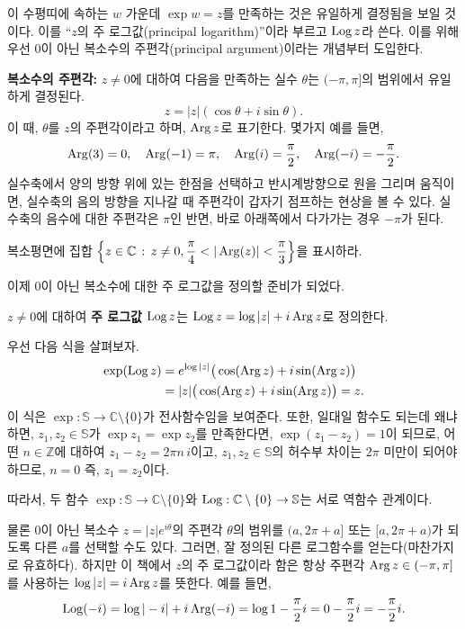 이 수평띠에 속하는 $w$ 가운데 $\exp w = z$를 만족하는 것은
유일하게 결정됨을 보일 것이다. 
이를 ``$z$의 주 로그값(principal logarithm)''이라 부르고 $\mathop{\mathrm{Log}} z$라 쓴다.
이를 위해 우선 $0$이 아닌 복소수의 주편각(principal argument)이라는 개념부터 도입한다.

{\bf 복소수의 주편각: }
$z\ne0$에 대하여 다음을 만족하는 실수 $\theta$는 $(-\pi, \pi]$의 범위에서 유일하게 결정된다.
$$
z = |z|(\cos \theta + i\sin\theta).
$$
이 때, $\theta$를 $z$의 주편각이라고 하며, $\mathop{\mathrm{Arg}} z$로 표기한다.
몇가지 예를 들면,
$$
\mathop{\mathrm{Arg}}(3) = 0, \quad \mathop{\mathrm{Arg}}(-1)=\pi, \quad
\mathop{\mathrm{Arg}}(i) = \frac\pi2, \quad \mathop{\mathrm{Arg}}(-i) = - \frac\pi2.
$$
실수축에서 양의 방향 위에 있는 한점을 선택하고
반시계방향으로 원을 그리며 움직이면, 실수축의 음의 방향을 지나갈 때
주편각이 갑자기 점프하는 현상을 볼 수 있다.
실수축의 음수에 대한 주편각은 $\pi$인 반면,
바로 아래쪽에서 다가가는 경우 $-\pi$가 된다.

\begin{salt_exercise}\label{ex-1-39}
복소평면에 집합 $\left\{ z \in\mathbb C \,:\, z\ne0, \displaystyle\frac\pi4 < |\mathop{\mathrm{Arg}}(z)| < \displaystyle\frac\pi3 \right\}$을
표시하라.
\end{salt_exercise}

이제 $0$이 아닌 복소수에 대한 주 로그값을 정의할 준비가 되었다.

\begin{saltdefinition} {}{} \label{def-1-3}
$z\ne0$에 대하여 \textbf{주 로그값} $\mathop{\mathrm{Log}} z$는 
$\mathop{\mathrm{Log}} z = \log |z| + i\mathop{\mathrm{Arg}} z$로 정의한다.
\end{saltdefinition}

우선 다음 식을 살펴보자.
\begin{align*}
\exp(\mathop{\mathrm{Log}} z) &= e^{\log |z|} \big( \cos(\mathop{\mathrm{Arg}} z) + i \sin(\mathop{\mathrm{Arg}} z) \big) \\
&= |z| \big( \cos(\mathop{\mathrm{Arg}} z) + i \sin(\mathop{\mathrm{Arg}} z) \big) = z.
\end{align*}
이 식은  $\exp: \mathbb S \to \mathbb C \setminus \{0\}$가 전사함수임을 보여준다.
또한, 일대일 함수도 되는데 왜냐 하면, $z_1, z_2 \in \mathbb S$가 $\exp z_1 = \exp z_2$를 만족한다면,
$\exp(z_1 - z_2) = 1$이 되므로, 
어떤 $n\in\mathbb Z$에 대하여 $z_1 - z_2 = 2\pi n\,i$이고,
$z_1, z_2 \in \mathbb S$의 허수부 차이는 $2\pi$ 미만이 되어야 하므로, $n=0$ 즉, 
$z_1 = z_2$이다.

따라서, 두 함수 $\exp : \mathbb S \to \mathbb C \setminus \{0\}$와
$\mathop{\mathrm{Log}} : \mathbb C \setminus \{0\} \to \mathbb S$는 서로 역함수 관계이다.

물론 $0$이 아닌 복소수 $z=|z|e^{i\theta}$의 주편각 $\theta$의 범위를 
$(a, 2\pi +a]$ 또는 $[a, 2\pi+a)$가 되도록 다른 $a$를 선택할 수도 있다.
그러면, 잘 정의된 다른 로그함수를 얻는다(마찬가지로 유효하다).
하지만 이 책에서 $z$의 주 로그값이라 함은 항상 주편각 $\mathop{\mathrm{Arg}} z \in (-\pi, \pi]$를 사용하는
$\log |z| = i\mathop{\mathrm{Arg}} z$를 뜻한다.
예를 들면,
$$
\mathop{\mathrm{Log}} (-i) = \log|-i| + i\mathop{\mathrm{Arg}}(-i) = \log 1 - \displaystyle\frac\pi2 i = 0 - \displaystyle\frac\pi 2 i = -\displaystyle\frac\pi 2 i.
$$

